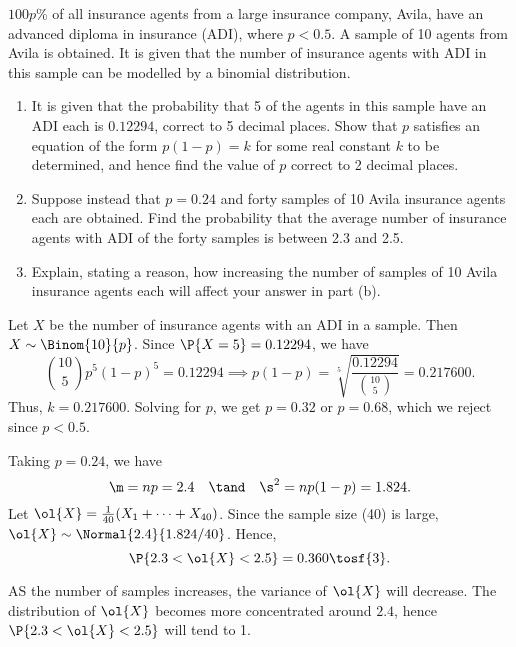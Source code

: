 \begin{problem}
    $100p$\% of all insurance agents from a large insurance company, Avila, have an advanced diploma in insurance (ADI), where $p<0.5$. A sample of 10 agents from Avila is obtained. It is given that the number of insurance agents with ADI in this sample can be modelled by a binomial distribution.

    \begin{enumerate}
        \item It is given that the probability that 5 of the agents in this sample have an ADI each is $0.12294$, correct to 5 decimal places. Show that $p$ satisfies an equation of the form $p(1-p)=k$ for some real constant $k$ to be determined, and hence find the value of $p$ correct to 2 decimal places.
        \item Suppose instead that $p=0.24$ and forty samples of 10 Avila insurance agents each are obtained. Find the probability that the average number of insurance agents with ADI of the forty samples is between 2.3 and 2.5.
        \item Explain, stating a reason, how increasing the number of samples of 10 Avila insurance agents each will affect your answer in part (b).
    \end{enumerate}
\end{problem}
\begin{solution}
    \begin{ppart}
        Let $X$ be the number of insurance agents with an ADI in a sample. Then $X \sim \Binom{10}{p}$. Since $\P{X = 5} = 0.12294$, we have \[\binom{10}{5} p^5 (1-p)^5 = 0.12294 \implies p(1-p) = \sqrt[5]{\frac{0.12294}{\binom{10}{5}}} = 0.217600.\] Thus, $k = 0.217600$. Solving for $p$, we get $p = 0.32$ or $p = 0.68$, which we reject since $p < 0.5$.
    \end{ppart}
    \begin{ppart}
        Taking $p = 0.24$, we have \[\m = np = 2.4 \quad \tand \quad \s^2 = np(1-p) = 1.824.\] Let $\ol{X} = \frac1{40} (X_1 + \dots + X_{40})$. Since the sample size (40) is large, $\ol{X} \sim \Normal{2.4}{1.824/40}$. Hence, \[\P{2.3 < \ol{X} < 2.5} = 0.360 \tosf{3}.\]
    \end{ppart}
    \begin{ppart}
        AS the number of samples increases, the variance of $\ol{X}$ will decrease. The distribution of $\ol{X}$ becomes more concentrated around $2.4$, hence $\P{2.3 < \ol{X} < 2.5}$ will tend to 1.
    \end{ppart}
\end{solution}

